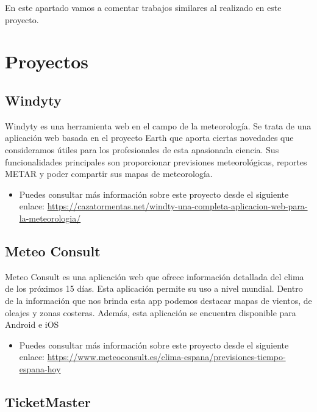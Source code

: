 
En este apartado vamos a comentar trabajos similares al realizado en este proyecto.

\section{Proyectos}

\subsection{Windyty}
Windyty es una herramienta web en el campo de la meteorología. Se trata de una aplicación web basada en el proyecto Earth que aporta ciertas novedades que consideramos útiles para los profesionales de esta apasionada ciencia. Sus funcionalidades principales son proporcionar previsiones meteorológicas, reportes METAR y poder compartir sus mapas de meteorología.



\begin{itemize}
    \item Puedes consultar más información sobre este proyecto desde el siguiente enlace: \url{https://cazatormentas.net/windty-una-completa-aplicacion-web-para-la-meteorologia/}
\end{itemize}

\subsection{Meteo Consult}
Meteo Consult es una aplicación web que ofrece información detallada del clima de los próximos 15 días. Esta aplicación permite su uso a nivel mundial. Dentro de la información que nos brinda esta app podemos destacar mapas de vientos, de oleajes y zonas costeras. Además, esta aplicación se encuentra disponible para Android e iOS


\begin{itemize}
    \item Puedes consultar más información sobre este proyecto desde el siguiente enlace: \url{https://www.meteoconsult.es/clima-espana/previsiones-tiempo-espana-hoy}
\end{itemize}

\subsection{TicketMaster}

